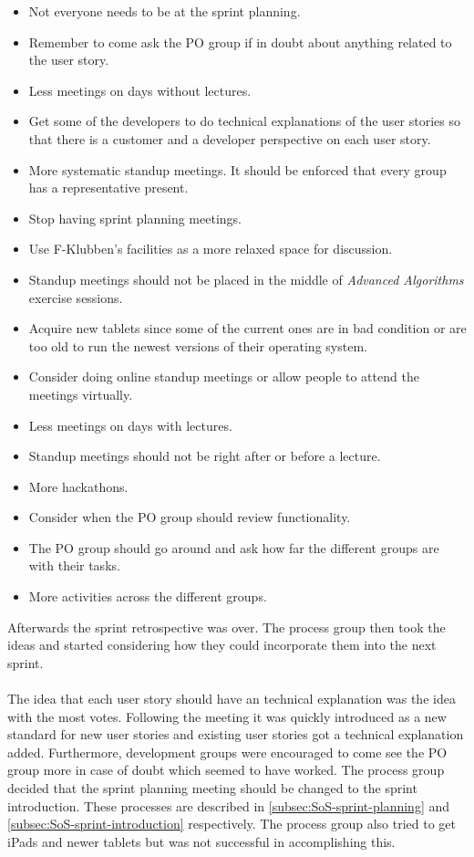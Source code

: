 \begin{itemize}
    \item Not everyone needs to be at the sprint planning.
    \item Remember to come ask the PO group if in doubt about anything related to the user story.
    \item Less meetings on days without lectures.
    \item Get some of the developers to do technical explanations of the user stories so that there is a customer and a developer perspective on each user story.
    \item More systematic standup meetings. It should be enforced that every group has a representative present.
    \item Stop having sprint planning meetings.
    \item Use F-Klubben's facilities as a more relaxed space for discussion. 
    \item Standup meetings should not be placed in the middle of \textit{Advanced Algorithms} exercise sessions.
    \item Acquire new tablets since some of the current ones are in bad condition or are too old to run the newest versions of their operating system.
    \item Consider doing online standup meetings or allow people to attend the meetings virtually.
    \item Less meetings on days with lectures.
    \item Standup meetings should not be right after or before a lecture.
    \item More hackathons.
    \item Consider when the PO group should review functionality. 
    \item The PO group should go around and ask how far the different groups are with their tasks.
    \item More activities across the different groups.
\end{itemize}
Afterwards the sprint retrospective was over.
The process group then took the ideas and started considering how they could incorporate them into the next sprint.
\\\\
The idea that each user story should have an technical explanation was the idea with the most votes. 
Following the meeting it was quickly introduced as a new standard for new user stories and existing user stories got a technical explanation added.
Furthermore, development groups were encouraged to come see the PO group more in case of doubt which seemed to have worked.
The process group decided that the sprint planning meeting should be changed to the sprint introduction.
These processes are described in \autoref{subsec:SoS-sprint-planning} and \autoref{subsec:SoS-sprint-introduction} respectively.
The process group also tried to get iPads and newer tablets but was not successful in accomplishing this.

